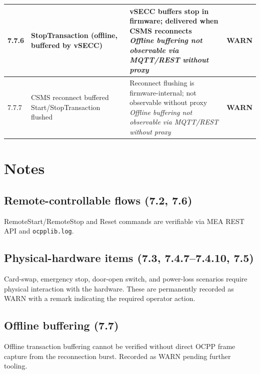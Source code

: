 \documentclass[10pt, a4paper]{article}
\begin{document}
\begin{longtable}{|L{1cm}|L{5.5cm}|M{7cm}|C{1.8cm}|}
\hline
\small 7.7.6 & \small StopTransaction (offline, buffered by vSECC) & vSECC buffers stop in firmware; delivered when CSMS reconnects{\newline\normalfont\footnotesize\itshape Offline buffering not observable via MQTT/REST without proxy} & \textcolor{warnorange}{\textbf{WARN}} \\
\hline
\small 7.7.7 & \small CSMS reconnect  buffered Start/StopTransaction flushed & Reconnect flushing is firmware-internal; not observable without proxy{\newline\normalfont\footnotesize\itshape Offline buffering not observable via MQTT/REST without proxy} & \textcolor{warnorange}{\textbf{WARN}} \\
\hline
\end{longtable}
\normalsize

\section{Notes}

\subsection*{Remote-controllable flows (7.2, 7.6)}
RemoteStart/RemoteStop and Reset commands are verifiable via MEA REST API and \texttt{ocpplib.log}.

\subsection*{Physical-hardware items (7.3, 7.4.7--7.4.10, 7.5)}
Card-swap, emergency stop, door-open switch, and power-loss scenarios require
physical interaction with the hardware. These are permanently recorded as WARN
with a remark indicating the required operator action.

\subsection*{Offline buffering (7.7)}
Offline transaction buffering cannot be verified without direct OCPP frame capture
from the reconnection burst. Recorded as WARN pending further tooling.
\end{document}
